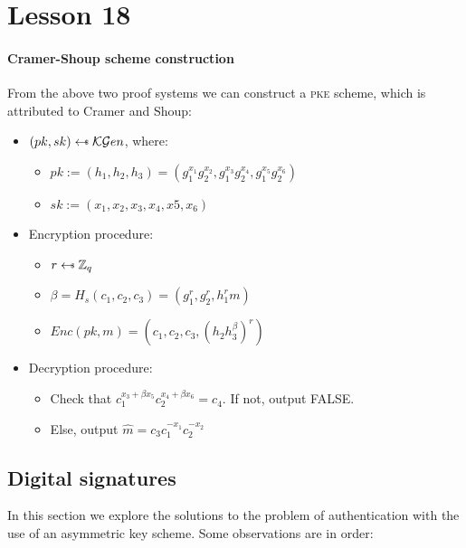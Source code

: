 \chapter*{Lesson 18}

\subsubsection{Cramer-Shoup scheme construction}

From the above two proof systems we can construct a \textsc{pke} scheme, which is attributed to Cramer and Shoup:


\begin{itemize}
    \item $(pk, sk) \pickUAR \mathcal{KG}en$, where:
    \begin{itemize}
        \item $pk := (h_1, h_2, h_3) = (g_1^{x_1} g_2^{x_2}, g_1^{x_3} g_2^{x_4}, g_1^{x_5} g_2^{x_6})$
        \item $sk := (x_1, x_2, x_3, x_4, x5, x_6)$
    \end{itemize}
    \item Encryption procedure:
    \begin{itemize}
        \item $r \pickUAR \mathbb{Z}_q$
        \item $\beta = H_s(c_1, c_2, c_3) = (g_1^r, g_2^r, h_1^r m)$
        \item $Enc(pk, m) = (c_1, c_2, c_3, (h_2 h_3^\beta)^r)$
    \end{itemize}
    \item Decryption procedure:
    \begin{itemize}
        \item Check that $c_1^{x_3 + \beta x_5} c_2^{x_4 + \beta x_6} = c_4$. If not, output FALSE.
        \item Else, output $\hat{m} = c_3 c_1^{-x_1} c_2^{-x_2}$
    \end{itemize}
\end{itemize}

\section{Digital signatures}

In this section we explore the solutions to the problem of authentication with the use of an asymmetric key scheme. Some observations are in order:

